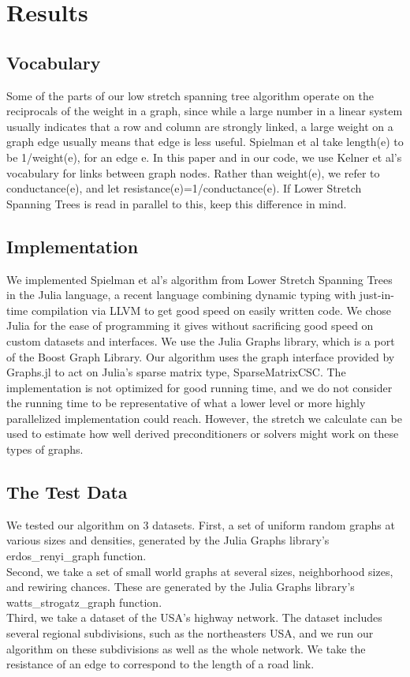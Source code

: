 \documentclass{article}
\begin{document}
\section*{Results}
\subsection*{Vocabulary}
Some of the parts of our low stretch spanning tree algorithm operate on the reciprocals of the weight in a graph, since while a large number in a linear system usually indicates that a row and column are strongly linked, a large weight on a graph edge usually means that edge is less useful.  Spielman et al take length(e) to be 1/weight(e), for an edge e.  In this paper and in our code, we use Kelner et al's vocabulary for links between graph nodes.  Rather than weight(e), we refer to conductance(e), and let resistance(e)=1/conductance(e).  If Lower Stretch Spanning Trees is read in parallel to this, keep this difference in mind.  
\subsection{Implementation}
We implemented Spielman et al's algorithm from Lower Stretch Spanning Trees in the Julia language, a recent language combining dynamic typing with just-in-time compilation via LLVM to get good speed on easily written code.  We chose Julia for the ease of programming it gives without sacrificing good speed on custom datasets and interfaces.  We use the Julia Graphs library\cite{juliagraphs}, which is a port of the Boost Graph Library.  Our algorithm uses the graph interface provided by Graphs.jl to act on Julia's sparse matrix type, SparseMatrixCSC.  The implementation is not optimized for good running time, and we do not consider the running time to be representative of what a lower level or more highly parallelized implementation could reach.  However, the stretch we calculate can be used to estimate how well derived preconditioners or solvers might work on these types of graphs.\\
\subsection*{The Test Data}
We tested our algorithm on 3 datasets.  First, a set of uniform random graphs at various sizes and densities, generated by the Julia Graphs library's erdos_renyi_graph function.\\
Second, we take a set of small world graphs at several sizes, neighborhood sizes, and rewiring chances.  These are generated by the Julia Graphs library's watts_strogatz_graph function.\\
Third, we take a dataset of the USA's highway network.  The dataset includes several regional subdivisions, such as the northeasters USA, and we run our algorithm on these subdivisions as well as the whole network.  We take the resistance of an edge to correspond to the length of a road link. \\
\end{document}
